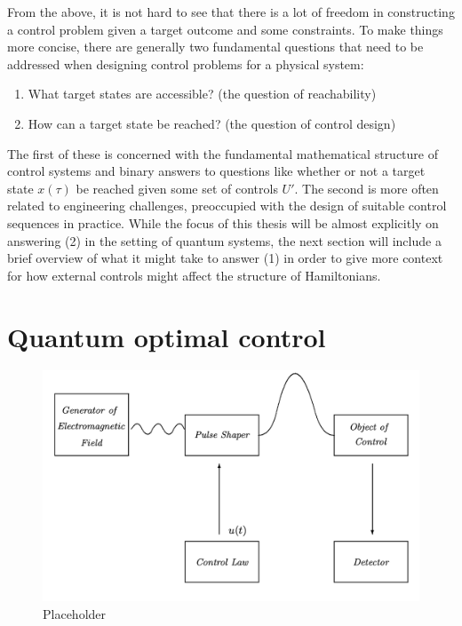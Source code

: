 From the above, it is not hard to see that there is a lot of freedom in constructing a control problem given a target outcome and some constraints. To make things more concise, there are generally two fundamental questions that need to be addressed when designing control problems for a physical system\cite{glaser_training_2015}:
\begin{enumerate}
    \item What target states are accessible? (the question of reachability) 
    \item How can a target state be reached? (the question of control design)
\end{enumerate}

The first of these is concerned with the fundamental mathematical structure of control systems \cite{schirmer_complete_2001, dalessandro_introduction_2021, dirr_lie_2008} and binary answers to questions like whether or not a target state $x(\tau)$ be reached given some set of controls $U'$. The second is more often related to engineering challenges, preoccupied with the design of suitable control sequences in practice. While the focus of this thesis will be almost explicitly on answering (2) in the setting of quantum systems, the next section will include a brief overview of what it might take to answer (1) in order to give more context for how external controls might affect the structure of Hamiltonians.

\section{Quantum optimal control}\label{sec:3.2_Quantum_optimal_control}

\begin{figure}[t]
\centering
\includegraphics[width=0.9\linewidth]{images/optimal_control_placeholder.png} \caption{Placeholder}\label{fig:optimal_control}
\end{figure}

